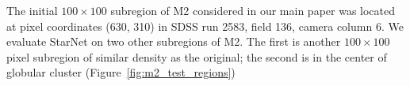 
The initial $100\times100$ subregion of M2 considered in our main paper was located at pixel coordinates (630, 310) in SDSS run 2583, field 136, camera column 6. 
We evaluate StarNet on two other subregions of M2.
The first is another $100\times100$ pixel subregion of similar density as the original;
the second is in the center of globular cluster
(Figure~\ref{fig:m2_test_regions})





